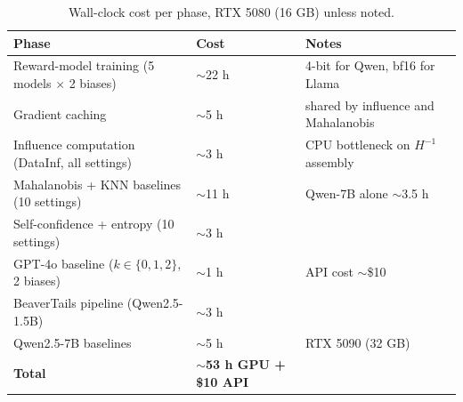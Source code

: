 \documentclass[11pt,a4paper]{article}
\begin{document}
\begin{table}[H]
    \centering
    \small
    \caption{Wall-clock cost per phase, RTX 5080 (16 GB) unless noted.}
    \begin{tabular}{lll}
        \toprule
        \textbf{Phase} & \textbf{Cost} & \textbf{Notes} \\
        \midrule
        Reward-model training (5 models $\times$ 2 biases) & $\sim$22 h & 4-bit for Qwen, bf16 for Llama \\
        Gradient caching & $\sim$5 h & shared by influence and Mahalanobis \\
        Influence computation (DataInf, all settings) & $\sim$3 h & CPU bottleneck on $H^{-1}$ assembly \\
        Mahalanobis + KNN baselines (10 settings) & $\sim$11 h & Qwen-7B alone $\sim$3.5 h \\
        Self-confidence + entropy (10 settings) & $\sim$3 h &  \\
        GPT-4o baseline ($k\in\{0,1,2\}$, 2 biases) & $\sim$1 h & API cost $\sim$\$10 \\
        BeaverTails pipeline (Qwen2.5-1.5B) & $\sim$3 h &  \\
        Qwen2.5-7B baselines & $\sim$5 h & RTX 5090 (32 GB) \\
        \midrule
        \textbf{Total} & \textbf{$\sim$53 h GPU + \$10 API} &  \\
        \bottomrule
    \end{tabular}
\end{table}
\end{document}

